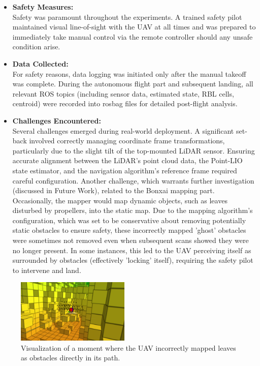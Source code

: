 \begin{itemize}
                \item \textbf{Safety Measures: } \\
                    Safety was paramount throughout the experiments. 
                    A trained safety pilot maintained visual line-of-sight with the UAV at all times and was prepared to immediately take manual control via the remote controller should any unsafe condition arise.
                \item \textbf{Data Collected: } \\
                    For safety reasons, data logging was initiated only after the manual takeoff was complete. 
                    During the autonomous flight part and subsequent landing, all relevant ROS topics (including sensor data, estimated state, \ac{RBL} cells, centroid) were recorded into rosbag files for detailed post-flight analysis.
                \item \textbf{Challenges Encountered: } \\
                    Several challenges emerged during real-world deployment. 
                    A significant set-back involved correctly managing coordinate frame transformations, particularly due to the slight tilt of the top-mounted LiDAR sensor. 
                    Ensuring accurate alignment between the LiDAR's point cloud data, the Point-LIO state estimator, and the navigation algorithm's reference frame required careful configuration. 
                    Another challenge, which warrants further investigation (discussed in Future Work), related to the Bonxai mapping part. 
                    Occasionally, the mapper would map dynamic objects, such as leaves disturbed by propellers, into the static map. 
                    Due to the mapping algorithm's configuration, which was set to be conservative about removing potentially static obstacles to ensure safety, these incorrectly mapped 'ghost' obstacles were sometimes not removed even when subsequent scans showed they were no longer present. 
                    In some instances, this led to the UAV perceiving itself as surrounded by obstacles (effectively 'locking' itself), requiring the safety pilot to intervene and land.
            \end{itemize}

            \begin{figure}[H]
                \centering
                \includegraphics[width=0.48\textwidth]{./fig/rviz/deadlock_moment_mapping.png}
                \caption{
                    Visualization of a moment where the UAV incorrectly mapped leaves as obstacles directly in its path.
                }
                \label{fig:map_fail}
            \end{figure}

